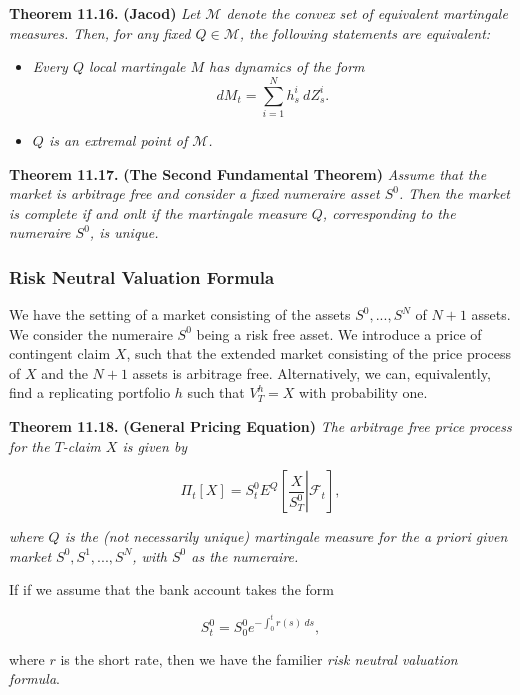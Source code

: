 \documentclass[
]{article}
\providecommand{\tightlist}{%
  \setlength{\itemsep}{0pt}\setlength{\parskip}{0pt}}
\begin{document}
\textbf{Theorem 11.16.} \textbf{(Jacod)} \emph{Let \(\mathcal{M}\)
denote the convex set of equivalent martingale measures. Then, for any
fixed \(Q\in\mathcal{M}\), the following statements are equivalent:}

\begin{itemize}
\tightlist
\item
  \emph{Every \(Q\) local martingale \(M\) has dynamics of the form} \[
    dM_t=\sum_{i=1}^Nh_s^i\ dZ_s^i.
    \]
\item
  \emph{\(Q\) is an extremal point of \(\mathcal{M}\).}
\end{itemize}

\textbf{Theorem 11.17.} \textbf{(The Second Fundamental Theorem)}
\emph{Assume that the market is arbitrage free and consider a fixed
numeraire asset \(S^0\). Then the market is complete if and onlt if the
martingale measure \(Q\), corresponding to the numeraire \(S^0\), is
unique.}

\hypertarget{risk-neutral-valuation-formula}{%
\subsubsection{Risk Neutral Valuation
Formula}\label{risk-neutral-valuation-formula}}

We have the setting of a market consisting of the assets \(S^0,...,S^N\)
of \(N+1\) assets. We consider the numeraire \(S^0\) being a risk free
asset. We introduce a price of contingent claim \(X\), such that the
extended market consisting of the price process of \(X\) and the \(N+1\)
assets is arbitrage free. Alternatively, we can, equivalently, find a
replicating portfolio \(h\) such that \(V^h_T=X\) with probability one.

\textbf{Theorem 11.18.} \textbf{(General Pricing Equation)} \emph{The
arbitrage free price process for the \(T\)-claim \(X\) is given by}

\[
\Pi_t[X]=S_t^0E^Q\left[\left.\frac{X}{S^0_T}\right\vert \mathcal{F}_t\right],\tag{11.41}
\]

\emph{where \(Q\) is the (not necessarily unique) martingale measure for
the a priori given market \(S^0,S^1,...,S^N\), with \(S^0\) as the
numeraire.}

If if we assume that the bank account takes the form

\[
S_t^0=S_0^0e^{-\int_0^tr(s)\ ds},
\]

where \(r\) is the short rate, then we have the familier \emph{risk
neutral valuation formula}.
\end{document}
